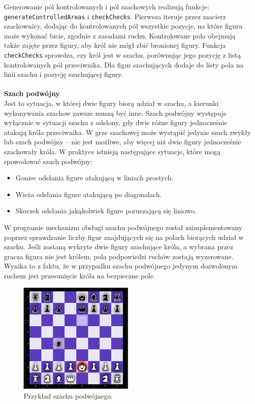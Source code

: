 \documentclass[12pt,a4paper]{article}
\begin{document}
\newpage

\noindent
Generowanie pól kontrolowanych i pól szachowych realizują funkcje: \texttt{generateControlledAreas} i \texttt{checkChecks}. Pierwsza iteruje przez macierz szachownicy, dodając do kontrolowanych pól wszystkie pozycje, na które figura może wykonać bicie, zgodnie z zasadami ruchu. Kontrolowane pola obejmują także zajęte przez figury, aby król nie mógł zbić bronionej figury. Funkcja \texttt{checkChecks} sprawdza, czy król jest w szachu, porównując jego pozycję z listą kontrolowanych pól przeciwnika. Dla figur szachujących dodaje do listy pola na linii szachu i pozycję szachującej figury.
\\\\

\noindent \textbf{Szach podwójny}\\
Jest to sytuacja, w której dwie figury biorą udział w szachu, a kierunki wykonywania szachow zawsze muszą być inne. Szach podwójny występuje wyłącznie w sytuacji szachu z odsłony, gdy dwie różne figury jednocześnie atakują króla przeciwnika. W grze szachowej może wystąpić jedynie szach zwykły lub szach podwójny – nie jest możliwe, aby więcej niż dwie figury jednocześnie szachowały króla. W praktyce istnieją następujące sytuacje, które mogą spowodować szach podwójny:

\begin{itemize}
    \item Goniec odsłania figure atakującą w liniach prostych.
    \item Wieża odsłania figure atakującą po diagonalach.
    \item Skoczek odsłania jakąkolwiek figure poruszającą się liniowo.
\end{itemize}

W programie mechanizm obsługi szachu podwójnego został zaimplementowany poprzez sprawdzanie liczby figur znajdujących się na polach biorących udział w szachu. Jeśli zostaną wykryte dwie figury szachujące króla, a wybrana przez gracza figura nie jest królem, pola podpowiedzi ruchów zostają wyzerowane. Wynika to z faktu, że w przypadku szachu podwójnego jedynym dozwolonym ruchem jest przesunięcie króla na bezpieczne pole.

\vspace{0.5cm}
\begin{figure}[h!]
    \centering
    \includegraphics[width=0.5\textwidth]{images/imp_double_check.png}
    \caption{Przykład szachu podwójnego.}
\end{figure}
\end{document}
